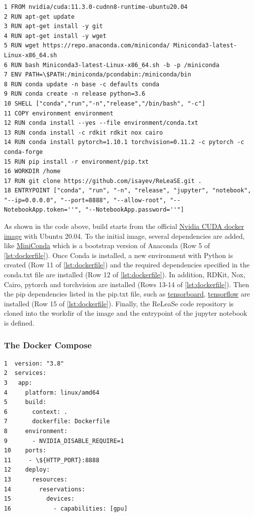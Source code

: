 \documentclass[a4paper]{article}
\begin{document}
\begin{lstlisting}[label={lst:dockerfile}]
1 FROM nvidia/cuda:11.3.0-cudnn8-runtime-ubuntu20.04
2 RUN apt-get update
3 RUN apt-get install -y git
4 RUN apt-get install -y wget
5 RUN wget https://repo.anaconda.com/miniconda/ Miniconda3-latest-Linux-x86_64.sh
6 RUN bash Miniconda3-latest-Linux-x86_64.sh -b -p /miniconda
7 ENV PATH=\$PATH:/miniconda/pcondabin:/miniconda/bin
8 RUN conda update -n base -c defaults conda
9 RUN conda create -n release python=3.6
10 SHELL ["conda","run","-n","release","/bin/bash", "-c"]
11 COPY environment environment
12 RUN conda install --yes --file environment/conda.txt
13 RUN conda install -c rdkit rdkit nox cairo
14 RUN conda install pytorch=1.10.1 torchvision=0.11.2 -c pytorch -c conda-forge
15 RUN pip install -r environment/pip.txt
16 WORKDIR /home
17 RUN git clone https://github.com/isayev/ReLeaSE.git .
18 ENTRYPOINT ["conda", "run", "-n", "release", "jupyter", "notebook", "--ip=0.0.0.0", "--port=8888", "--allow-root", "--NotebookApp.token=''", "--NotebookApp.password=''"]
\end{lstlisting}

As shown in the code above, build starts from the official \href{https://hub.docker.com/r/nvidia/cuda}{Nvidia CUDA docker image} with Ubuntu 20.04. To the initial image, several dependencies are added, like \href{https://docs.conda.io/en/latest/miniconda.html}{MiniConda} which is a bootstrap version of Anaconda (Row 5 of \ref{lst:dockerfile}).
Once Conda is installed, a new environment with Python is created (Row 11 of \ref{lst:dockerfile}) and the required dependencies specified in the conda.txt file are installed (Row 12 of \ref{lst:dockerfile}). In addition, RDKit, Nox, Cairo, pytorch and torchvision are installed (Rows 13-14 of \ref{lst:dockerfile}). 
Then the pip dependencies listed in the pip.txt file, such as \href{https://www.tensorflow.org/tensorboard}{tensorboard}, \href{https://www.tensorflow.org/}{tensorflow} are installed (Row 15 of \ref{lst:dockerfile}).
Finally, the ReLeaSe code repository is cloned into the workdir of the image and the entrypoint of the jupyter notebook is defined.

\subsubsection{The Docker Compose}\label{sec:The Docker Compose}

\begin{lstlisting}
1  version: "3.8"
2  services:
3   app:
4     platform: linux/amd64
5     build:
6       context: .
7       dockerfile: Dockerfile
8     environment:
9       - NVIDIA_DISABLE_REQUIRE=1
10    ports:
11     - \${HTTP_PORT}:8888
12    deploy:
13      resources:
14        reservations:
15          devices:
16            - capabilities: [gpu]
\end{lstlisting}
\end{document}
